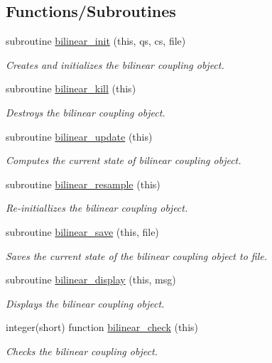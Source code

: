 \subsection*{Functions/\+Subroutines}
\begin{DoxyCompactItemize}
\item 
subroutine \hyperlink{namespacebilinear__class_a767f35cd3ebd5ef00f6a55fd775c3a27}{bilinear\+\_\+init} (this, qs, cs, file)
\begin{DoxyCompactList}\small\item\em Creates and initializes the bilinear coupling object. \end{DoxyCompactList}\item 
subroutine \hyperlink{namespacebilinear__class_ae206ab58d224c9a0b7e25ac038e003ae}{bilinear\+\_\+kill} (this)
\begin{DoxyCompactList}\small\item\em Destroys the bilinear coupling object. \end{DoxyCompactList}\item 
subroutine \hyperlink{namespacebilinear__class_a37ead815723c4c247c156200f5bf4721}{bilinear\+\_\+update} (this)
\begin{DoxyCompactList}\small\item\em Computes the current state of bilinear coupling object. \end{DoxyCompactList}\item 
subroutine \hyperlink{namespacebilinear__class_aac587f5ea6d66ee89ff3210b10569777}{bilinear\+\_\+resample} (this)
\begin{DoxyCompactList}\small\item\em Re-\/initiallizes the bilinear coupling object. \end{DoxyCompactList}\item 
subroutine \hyperlink{namespacebilinear__class_a5fe875f5d4db31ef7a7e721ba4a0146a}{bilinear\+\_\+save} (this, file)
\begin{DoxyCompactList}\small\item\em Saves the current state of the bilinear coupling object to file. \end{DoxyCompactList}\item 
subroutine \hyperlink{namespacebilinear__class_a4346246df7738e0d609716d961a3b94c}{bilinear\+\_\+display} (this, msg)
\begin{DoxyCompactList}\small\item\em Displays the bilinear coupling object. \end{DoxyCompactList}\item 
integer(short) function \hyperlink{namespacebilinear__class_ab2484d90163983597fb17b15e480e675}{bilinear\+\_\+check} (this)
\begin{DoxyCompactList}\small\item\em Checks the bilinear coupling object. \end{DoxyCompactList}\end{DoxyCompactItemize}


